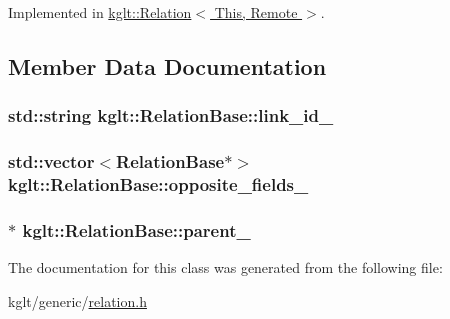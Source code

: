Implemented in \hyperlink{classkglt_1_1_relation_a95d281bfeb743e57f4809539b9a7e1c0}{kglt\-::\-Relation$<$ This, Remote $>$}.



\subsection{Member Data Documentation}
\hypertarget{classkglt_1_1_relation_base_a93f3ecd2c79ea9c9bcc705fcfe2d6cf4}{
\subsubsection[{link\-\_\-id\-\_\-}]{\setlength{\rightskip}{0pt plus 5cm}std\-::string kglt\-::\-Relation\-Base\-::link\-\_\-id\-\_\-\hspace{0.3cm}{\ttfamily [protected]}}}\label{classkglt_1_1_relation_base_a93f3ecd2c79ea9c9bcc705fcfe2d6cf4}
\hypertarget{classkglt_1_1_relation_base_ae8efcb162123c8e708c04164c5ab31fe}{
\subsubsection[{opposite\-\_\-fields\-\_\-}]{\setlength{\rightskip}{0pt plus 5cm}std\-::vector$<${\bf Relation\-Base}$\ast$$>$ kglt\-::\-Relation\-Base\-::opposite\-\_\-fields\-\_\-\hspace{0.3cm}{\ttfamily [protected]}}}\label{classkglt_1_1_relation_base_ae8efcb162123c8e708c04164c5ab31fe}
\hypertarget{classkglt_1_1_relation_base_ae1eb73b4104c5684dfb549972d54b891}{
\subsubsection[{parent\-\_\-}]{$\ast$ kglt\-::\-Relation\-Base\-::parent\-\_\-\hspace{0.3cm}{\ttfamily [protected]}}}\label{classkglt_1_1_relation_base_ae1eb73b4104c5684dfb549972d54b891}


The documentation for this class was generated from the following file\-:\begin{DoxyCompactItemize}
\item 
kglt/generic/\hyperlink{relation_8h}{relation.\-h}\end{DoxyCompactItemize}
